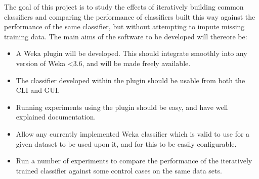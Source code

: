 The goal of this project is to study the effects of iteratively building common classifiers and comparing the performance of classifiers built this way against the performance of the same classifier, but without attempting to impute missing training data. The main aims of the software to be developed will thereore be:

\begin{itemize}
\item A Weka plugin will be developed. This should integrate smoothly into any version of Weka \textless 3.6, and will be made freely available. 
\item The classifier developed within the plugin should be usable from both the CLI and GUI.
\item Running experiments using the plugin should be easy, and have well explained documentation.
\item Allow any currently implemented Weka classifier which is valid to use for a given dataset to be used upon it, and for this to be easily configurable.
\item Run a number of experiments to compare the performance of the iteratively trained classifier against some control cases on the same data sets.
\end{itemize}
